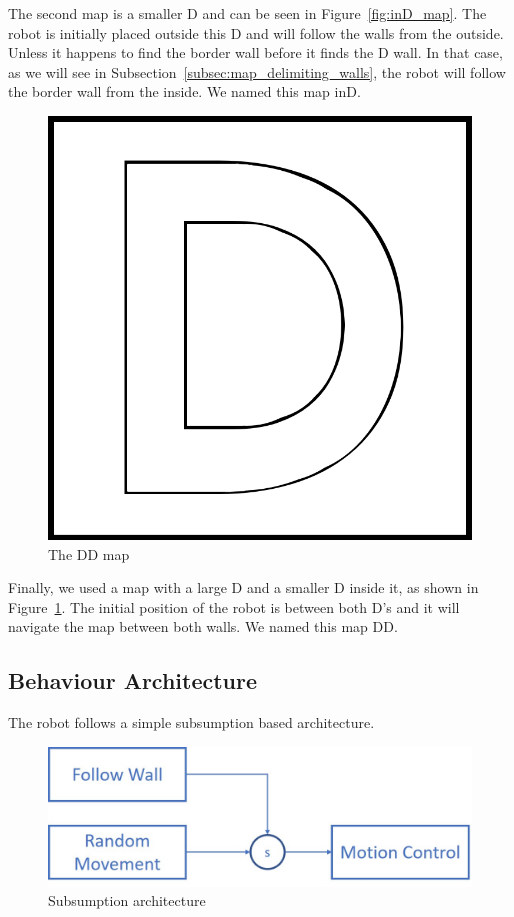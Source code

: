 \documentclass[10pt,journal,compsoc]{IEEEtran}
\begin{document}
The second map is a smaller D and can be seen in Figure~\ref{fig:inD_map}. The robot is initially placed outside this D and will follow the walls from the outside. Unless it happens to find the border wall before it finds the D wall. In that case, as we will see in Subsection~\ref{subsec:map_delimiting_walls}, the robot will follow the border wall from the inside. We named this map inD.

\begin{figure}[thpb]
\centering
\includegraphics[scale=0.2]{img/DD.png}
\caption{The DD map}
\label{fig:DD_map}
\end{figure}

Finally, we used a map with a large D and a smaller D inside it, as shown in Figure~\ref{fig:DD_map}. The initial position of the robot is between both D's and it will navigate the map between both walls. We named this map DD.

\subsection{Behaviour Architecture}

The robot follows a simple subsumption based architecture.

\begin{figure}[thpb]
\centering
\includegraphics[scale=0.265]{img/architecture.jpg}
\caption{Subsumption architecture}
\label{fig:architecture}
\end{figure}
\end{document}
